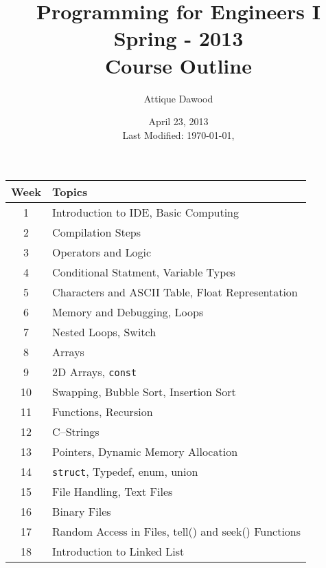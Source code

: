 \documentclass[12pt,a4paper]{article}
\title{\vspace{-2cm}Programming for Engineers I\\Spring - 2013\\Course Outline}
\author{Attique Dawood}
\date{April 23, 2013\\[0.2cm] Last Modified: \today, \currenttime}
\begin{document}
\maketitle
\begin{table}[H]
\begin{center}
\vspace{-0.3cm}
	\begin{tabular}{|c|p{10cm}|}
	\hline \hline
		\rule{0pt}{2.6ex} \textbf{Week} & \textbf{Topics}\\
		\hline
		1 \rule{0pt}{2.6ex} & Introduction to IDE, Basic Computing\\
		2 & Compilation Steps\\
		3 & Operators and Logic\\
		4 & Conditional Statment, Variable Types\\
		5 & Characters and ASCII Table, Float Representation\\
		6 & Memory and Debugging, Loops\\
		7 & Nested Loops, Switch\\
		8 & Arrays\\
		9 & 2D Arrays, \texttt{const}\\
		10 & Swapping, Bubble Sort, Insertion Sort\\
		11 & Functions, Recursion\\
		12 & C--Strings\\
		13 & Pointers, Dynamic Memory Allocation\\
		14 & \texttt{struct}, Typedef, enum, union\\
		15 & File Handling, Text Files\\
		16 & Binary Files\\
		17 & Random Access in Files, tell() and seek() Functions\\
		18 & Introduction to Linked List\\
	\hline \hline
	\end{tabular}
\end{center}
\label{Programming-I-Course-Outline}
\end{table}
\nocite{*}


\end{document}
